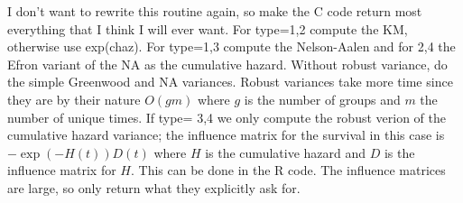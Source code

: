 \documentclass{article}
\begin{document}
I don't want to rewrite this routine again, so make the C code return
most everything that I think I will ever want. 
For type=1,2 compute the KM, otherwise use exp(chaz).
For type=1,3 compute the Nelson-Aalen and for 
2,4  the Efron variant of the NA as the cumulative hazard.
Without robust variance, do the simple Greenwood and NA variances.
Robust variances take more time since they are by their nature $O(gm)$ where
$g$ is the number of groups and $m$ the number of unique times.
If type= 3,4 we only compute the
robust verion of the cumulative hazard variance; 
the influence matrix for the survival in this case is
$-\exp(-H(t)) D(t)$ where $H$ is the cumulative hazard and $D$
is the influence matrix for $H$.
This can be done in the R code.   
The influence matrices are large, so only return what they explicitly ask
for. 
\end{document}
